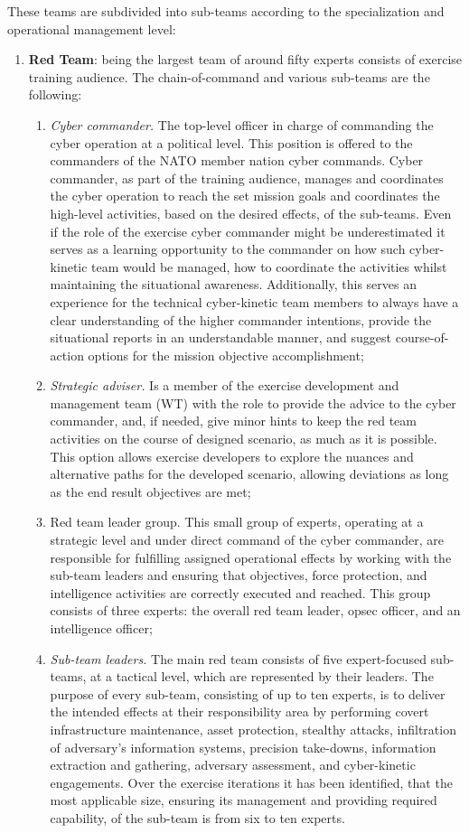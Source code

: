 These teams are subdivided into sub-teams according to the specialization and operational management level:
\begin{enumerate}
    \item \textbf{Red Team}: being the largest team of around fifty experts consists of exercise training audience. The chain-of-command and various sub-teams are the following:
    \begin{enumerate}
        \item \textit{Cyber commander.} The top-level officer in charge of commanding the cyber operation at a political level. This position is offered to the commanders of the NATO member nation cyber commands. Cyber commander, as part of the training audience, manages and coordinates the cyber operation to reach the set mission goals and coordinates the high-level activities, based on the desired effects, of the sub-teams. Even if the role of the exercise cyber commander might be underestimated it serves as a learning opportunity to the commander on how such cyber-kinetic team would be managed, how to coordinate the activities whilst maintaining the situational awareness. Additionally, this serves an experience for the technical cyber-kinetic team members to always have a clear understanding of the higher commander intentions, provide the situational reports in an understandable manner, and suggest course-of-action options for the mission objective accomplishment;
        \item \textit{Strategic adviser.} Is a member of the exercise development and management team (WT) with the role to provide the advice to the cyber commander, and, if needed, give minor hints to keep the red team activities on the course of designed scenario, as much as it is possible. This option allows exercise developers to explore the nuances and alternative paths for the developed scenario, allowing deviations as long as the end result objectives are met;
        \item {Red team leader group.} This small group of experts, operating at a strategic level and under direct command of the cyber commander, are responsible for fulfilling assigned operational effects by working with the sub-team leaders and ensuring that objectives, force protection, and intelligence activities are correctly executed and reached. This group consists of three experts: the overall red team leader, \gls{opsec} officer, and an intelligence officer;
        \item \textit{Sub-team leaders.} The main red team consists of five expert-focused sub-teams, at a tactical level, which are represented by their leaders. The purpose of every sub-team, consisting of up to ten experts, is to deliver the intended effects at their responsibility area by performing covert infrastructure maintenance, asset protection, stealthy attacks, infiltration of adversary's information systems, precision take-downs, information extraction and gathering, adversary assessment, and cyber-kinetic engagements. Over the exercise iterations it has been identified, that the most applicable size, ensuring its management and providing required capability, of the sub-team is from six to ten experts.

\end{enumerate}
\end{enumerate}
